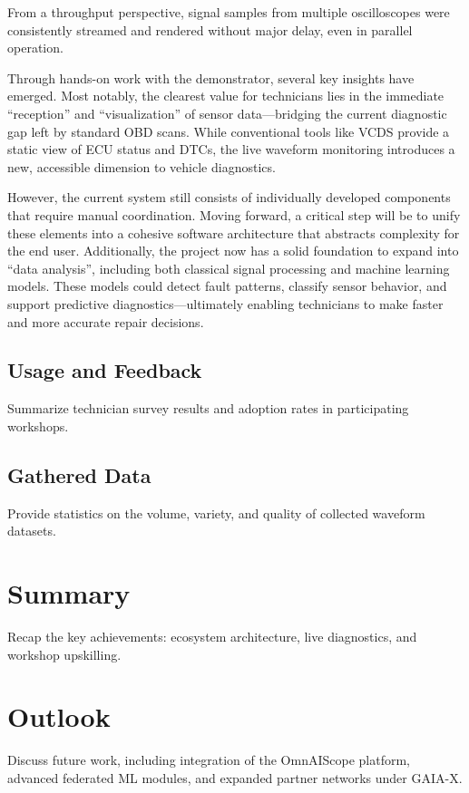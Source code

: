 From a throughput perspective, signal samples from multiple oscilloscopes were consistently streamed and rendered without major delay, even in parallel operation. 

Through hands-on work with the demonstrator, several key insights have emerged. 
Most notably, the clearest value for technicians lies in the immediate ``reception'' and ``visualization'' of sensor data—bridging the current diagnostic gap left by standard OBD scans. 
While conventional tools like VCDS provide a static view of ECU status and DTCs, the live waveform monitoring introduces a new, accessible dimension to vehicle diagnostics.

However, the current system still consists of individually developed components that require manual coordination. 
Moving forward, a critical step will be to unify these elements into a cohesive software architecture that abstracts complexity for the end user. 
Additionally, the project now has a solid foundation to expand into ``data analysis'', including both classical signal processing and machine learning models. 
These models could detect fault patterns, classify sensor behavior, and support predictive diagnostics—ultimately enabling technicians to make faster and more accurate repair decisions.



\subsection{Usage and Feedback}
Summarize technician survey results and adoption rates in participating workshops.

\subsection{Gathered Data}
Provide statistics on the volume, variety, and quality of collected waveform datasets.

\section{Summary}
Recap the key achievements: ecosystem architecture, live diagnostics, and workshop upskilling.

\section{Outlook}
Discuss future work, including integration of the OmnAIScope platform, advanced federated ML modules, and expanded partner networks under GAIA-X.


